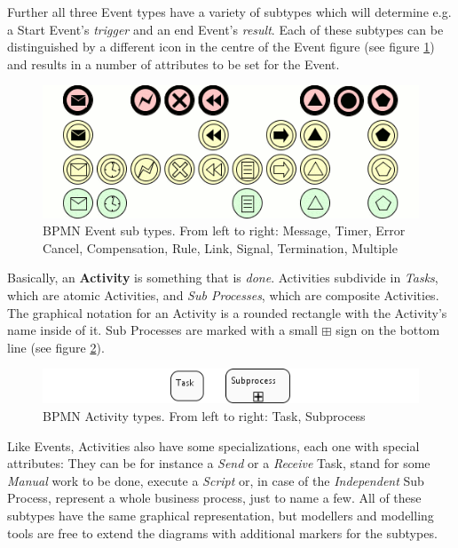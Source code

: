 Further all three Event types have a variety of subtypes which will determine
e.g. a Start Event's \emph{trigger} and an end Event's \emph{result}.  Each of
these subtypes can be distinguished by a different icon in the centre of the Event
figure (see figure \ref{fig:triggers}) and results in a number of attributes to
be set for the Event.

\begin{figure}[ht]
	\centering
	\includegraphics[width=.75\textwidth]{figures/bpmn/triggers.png}
	\caption[BPMN Event sub types]{BPMN Event sub types.  From left to right:
	Message, Timer, Error Cancel, Compensation, Rule, Link, Signal, Termination,
	Multiple}
	\label{fig:triggers}
\end{figure}

Basically, an \textbf{Activity} is something that is \emph{done}.  Activities
subdivide in \emph{Tasks}, which are atomic Activities, and \emph{Sub Processes},
which are composite Activities.  The graphical notation for an Activity is a
rounded rectangle with the Activity's name inside of it.  Sub Processes are marked
with a small $ \boxplus $ sign on the bottom line (see figure \ref{fig:activities}).

\begin{figure}[ht]
	\centering
	\includegraphics[width=.75\textwidth]{figures/bpmn/activities.png}
	\caption[BPMN Activity types]{BPMN Activity types.  From left to right: Task,
	Subprocess}
	\label{fig:activities}
\end{figure}

Like Events, Activities also have some specializations, each one with special
attributes: They can be for instance a \emph{Send} or a \emph{Receive} Task, stand
for some \emph{Manual} work to be done, execute a \emph{Script} or, in case of
the \emph{Independent} Sub Process, represent a whole business process, just to
name a few.  All of these subtypes have the same graphical representation, but
modellers and modelling tools are free to extend the diagrams with additional
markers for the subtypes.

